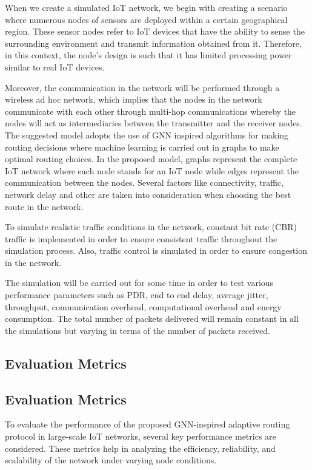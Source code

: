 \documentclass[a4paper,fleqn]{cas-dc}
\numberwithin{equation}{section}
\begin{document}
When we create a simulated IoT network, we begin with creating a scenario where numerous nodes of sensors are deployed within a certain geographical region. These sensor nodes refer to IoT devices that have the ability to sense the surrounding environment and transmit information obtained from it. Therefore, in this context, the node's design is such that it has limited processing power similar to real IoT devices.



Moreover, the communication in the network will be performed through a wireless ad hoc network, which implies that the nodes in the network communicate with each other through multi-hop communications whereby the nodes will act as intermediaries between the transmitter and the receiver nodes.
The suggested model adopts the use of GNN inspired algorithms for making routing decisions where machine learning is carried out in graphs to make optimal routing choices. In the proposed model, graphs represent the complete IoT network where each node stands for an IoT node while edges represent the communication between the nodes. Several factors like connectivity, traffic, network delay and other are taken into consideration when choosing the best route in the network.

To simulate realistic traffic conditions in the network, constant bit rate (CBR) traffic is implemented in order to ensure consistent traffic throughout the simulation process. Also, traffic control is simulated in order to ensure congestion in the network.

The simulation will be carried out for some time in order to test various performance parameters such as PDR, end to end delay, average jitter, throughput, communication overhead, computational overhead and energy consumption. The total number of packets delivered will remain constant in all the simulations but varying in terms of the number of packets received.
\subsection{Evaluation Metrics}
\subsection{Evaluation Metrics}

To evaluate the performance of the proposed GNN-inspired adaptive routing protocol in large-scale IoT networks, several key performance metrics are considered. These metrics help in analyzing the efficiency, reliability, and scalability of the network under varying node conditions.
\end{document}
